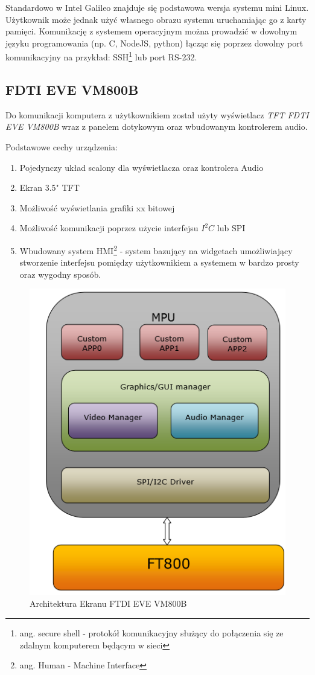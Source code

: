 \documentclass{xmgr}
\begin{document}
Standardowo w Intel Galileo znajduje się podstawowa wersja systemu mini Linux. Użytkownik może jednak użyć własnego obrazu systemu uruchamiając go z karty pamięci. Komunikację z systemem operacyjnym można prowadzić w dowolnym języku programowania (np. C, NodeJS, python) łącząc się poprzez dowolny port komunikacyjny na przykład: SSH\footnote{ang. secure shell - protokół komunikacyjny służący do połączenia się ze zdalnym komputerem będącym w sieci} lub port RS-232.

\subsection{FDTI EVE VM800B}
Do komunikacji komputera z użytkownikiem został użyty wyświetlacz \emph{TFT FDTI EVE VM800B} wraz z panelem dotykowym oraz wbudowanym kontrolerem audio. 

Podstawowe cechy urządzenia\cite{FTDI}:
\begin{enumerate}
	\item Pojedynczy układ scalony dla wyświetlacza oraz kontrolera Audio
	\item Ekran 3.5" TFT
	\item Możliwość wyświetlania grafiki xx bitowej
	\item Możliwość komunikacji poprzez użycie interfejsu $I^2C$ lub SPI
	\item Wbudowany system HMI\footnote{ang. Human - Machine Interface} - system bazujący na widgetach umożliwiający stworzenie interfejsu pomiędzy użytkownikiem a systemem w bardzo prosty oraz wygodny sposób.
\end{enumerate}

\begin{figure}[!h]
    \centering
    \includegraphics[height=0.4\textheight]{images/FTDIarchitecture.png}
    \caption{Architektura Ekranu FTDI EVE VM800B}
\end{figure}
\end{document}
